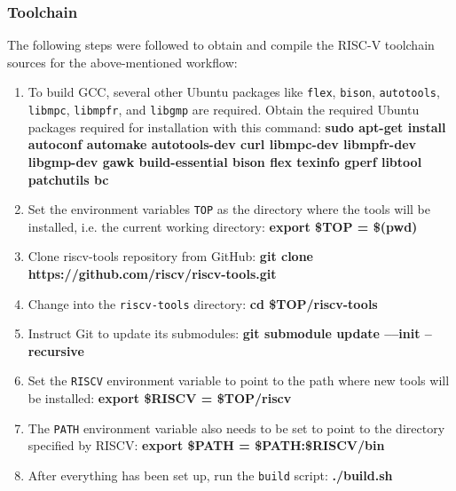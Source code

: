 \subsubsection{Toolchain}
\label{sect6_2_2_1}
The following steps were followed to obtain and compile the RISC-V toolchain sources for the above-mentioned workflow:
\begin{enumerate}
\item To build GCC, several other Ubuntu packages like \verb|flex|, \verb|bison|, \verb|autotools|, \verb|libmpc|, \verb|libmpfr|, and \verb|libgmp| are required. Obtain the required Ubuntu packages required for installation with this command:\newline
\small \textbf{sudo apt-get install autoconf automake autotools-dev curl libmpc-dev libmpfr-dev libgmp-dev gawk build-essential bison flex texinfo gperf libtool patchutils bc}

\item Set the environment variables \verb|TOP| as the directory where the tools will be installed, i.e. the current working directory:\newline
\small \textbf{export \$TOP = \$(pwd)}

\item Clone riscv-tools repository from GitHub:\newline
\small \textbf{git clone https://github.com/riscv/riscv-tools.git}

\item Change into the \verb|riscv-tools| directory:\newline
\small \textbf{cd \$TOP/riscv-tools}

\item Instruct Git to update its submodules:\newline
\small \textbf{git submodule update –--init --recursive}

\item Set the \verb|RISCV| environment variable to point to the path where new tools will be installed:\newline
\small \textbf{export \$RISCV = \$TOP/riscv}

\item The \verb|PATH| environment variable also needs to be set to point to the directory specified by RISCV:\newline
\small \textbf{export \$PATH = \$PATH:\$RISCV/bin}

\item After everything has been set up, run the \verb|build| script:\newline
\small \textbf{./build.sh}
\end{enumerate}

